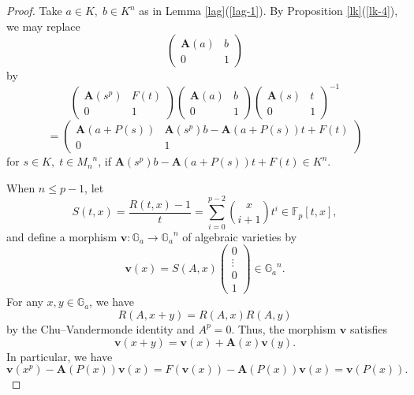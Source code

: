 \documentclass[10pt,a4paper]{amsart}
\numberwithin{equation}{section}
\theoremstyle{plain}
\theoremstyle{definition}
\begin{document}
\begin{proof}
  Take $a\in K,\;b\in K^n$ as in Lemma \ref{lag}(\ref{lag-1}).
 By Proposition \ref{lk}(\ref{lk-4}), we may replace
  \[
\begin{pmatrix}
  \mathbf{A}(a)&b\\
  0&1
\end{pmatrix}
\]
by
\[
\begin{pmatrix}
  \mathbf{A}(s^p)&F(t)\\
  0&1
\end{pmatrix}
\begin{pmatrix}
  \mathbf{A}(a)&b\\
  0&1
\end{pmatrix}
\begin{pmatrix}
  \mathbf{A}(s)&t\\
  0&1
\end{pmatrix}^{-1}
\]
\begin{equation}
=
\begin{pmatrix}
  \mathbf{A}(a+P(s))&\mathbf{A}(s^p)b-\mathbf{A}(a+P(s))t+F(t)\\
  0&1
\end{pmatrix}
\end{equation}
for $s\in K,\;t\in {M_n}^n$, if $\mathbf{A}(s^p)b-\mathbf{A}(a+P(s))t+F(t)\in K^n$.

When $n\leq p-1$, let
\begin{equation}
  S(t,x)=\frac{R(t,x)-1}{t}=\sum_{i=0}^{p-2}\binom{x}{i+1}t^i\in\mathbb{F}_p[t,x],
  \end{equation}
  and define a morphism $\mathbf{v}:\mathbb{G}_a\to {\mathbb{G}_a}^n$ of algebraic varieties by
\begin{equation}
\mathbf{v}(x)=S(A,x)
\begin{pmatrix}
  0\\
  \vdots\\
  0\\
  1
\end{pmatrix}\in {\mathbb{G}_a}^n.
\end{equation}
For any $x,y\in\mathbb{G}_a$, we have 
\begin{equation}
  R(A,x+y)=R(A,x)R(A,y)
\end{equation}
by the Chu--Vandermonde identity and $A^p=0$.
Thus, the morphism $\mathbf{v}$ satisfies
  \begin{equation}
  \mathbf{v}(x+y)=\mathbf{v}(x)+\mathbf{A}(x)\mathbf{v}(y).
  \end{equation}
  In particular, we have
  \begin{equation}\label{ex}
  \mathbf{v}(x^p)-\mathbf{A}(P(x))\mathbf{v}(x)=F(\mathbf{v}(x))-\mathbf{A}(P(x))\mathbf{v}(x)=\mathbf{v}(P(x)).
  \end{equation}


\end{proof}
\end{document}
